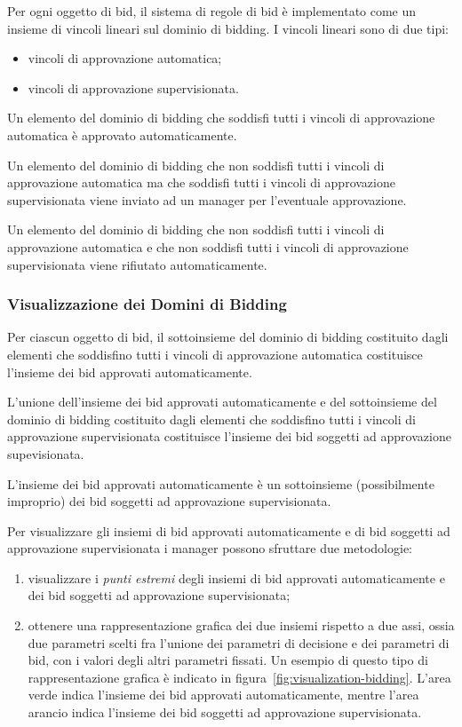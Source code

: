 Per ogni oggetto di bid, il sistema di regole di bid è implementato come un insieme di vincoli lineari sul dominio di bidding.
I vincoli lineari sono di due tipi:
\begin{itemize}
	\item vincoli di approvazione automatica;

	\item vincoli di approvazione supervisionata.
\end{itemize}

Un elemento del dominio di bidding che soddisfi tutti i vincoli di approvazione automatica è approvato automaticamente.

Un elemento del dominio di bidding che non soddisfi tutti i vincoli di approvazione automatica ma che soddisfi tutti i vincoli di approvazione supervisionata viene inviato ad un manager per l'eventuale approvazione.

Un elemento del dominio di bidding che non soddisfi tutti i vincoli di approvazione automatica e che non soddisfi tutti i vincoli di approvazione supervisionata viene rifiutato automaticamente.

\subsubsection{Visualizzazione dei Domini di Bidding}

Per ciascun oggetto di bid, il sottoinsieme del dominio di bidding costituito dagli elementi che soddisfino tutti i vincoli di approvazione automatica costituisce l'insieme dei bid approvati automaticamente.

L'unione dell'insieme dei bid approvati automaticamente e del sottoinsieme del dominio di bidding costituito dagli elementi che soddisfino tutti i vincoli di approvazione supervisionata costituisce l'insieme dei bid soggetti ad approvazione supevisionata.

L'insieme dei bid approvati automaticamente è un sottoinsieme (possibilmente improprio) dei bid soggetti ad approvazione supervisionata.

Per visualizzare gli insiemi di bid approvati automaticamente e di bid soggetti ad approvazione supervisionata i manager possono sfruttare due metodologie:
\begin{enumerate}
	\item visualizzare i \emph{punti estremi} degli insiemi di bid approvati automaticamente e dei bid soggetti ad approvazione supervisionata;

	\item ottenere una rappresentazione grafica dei due insiemi rispetto a due assi, ossia due parametri scelti fra l'unione dei parametri di decisione e dei parametri di bid, con i valori degli altri parametri fissati.
	Un esempio di questo tipo di rappresentazione grafica è indicato in figura~\ref{fig:visualization-bidding}.
	L'area verde indica l'insieme dei bid approvati automaticamente, mentre l'area arancio indica l'insieme dei bid soggetti ad approvazione supervisionata.
\end{enumerate}

